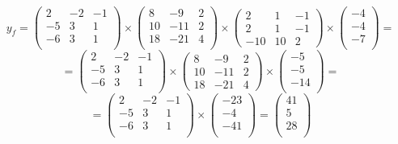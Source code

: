 \documentclass[12pt]{article}
\begin{document}
$$
	y_f =
	\begin{pmatrix}
		2  & -2 & -1 \\
		-5 & 3  & 1  \\
		-6 & 3  & 1  \\
	\end{pmatrix}
	\times
	\begin{pmatrix}
		8  & -9  & 2 \\
		10 & -11 & 2 \\
		18 & -21 & 4 \\
	\end{pmatrix}
	\times
	\begin{pmatrix}
		2   & 1  & -1 \\
		2   & 1  & -1 \\
		-10 & 10 & 2
	\end{pmatrix}
	\times
	\begin{pmatrix}
		-4 \\ -4 \\ -7 \\
	\end{pmatrix}
	=
$$
$$
	=
	\begin{pmatrix}
		2  & -2 & -1 \\
		-5 & 3  & 1  \\
		-6 & 3  & 1  \\
	\end{pmatrix}
	\times
	\begin{pmatrix}
		8  & -9  & 2 \\
		10 & -11 & 2 \\
		18 & -21 & 4
	\end{pmatrix}
	\times
	\begin{pmatrix}
		-5 \\ -5 \\ -14 \\
	\end{pmatrix}
	=
$$
$$
	=
	\begin{pmatrix}
		2  & -2 & -1 \\
		-5 & 3  & 1  \\
		-6 & 3  & 1  \\
	\end{pmatrix}
	\times
	\begin{pmatrix}
		-23 \\ -4 \\ -41 \\
	\end{pmatrix}
	=
	\begin{pmatrix}
		41 \\ 5 \\ 28 \\
	\end{pmatrix}
$$
\end{document}
